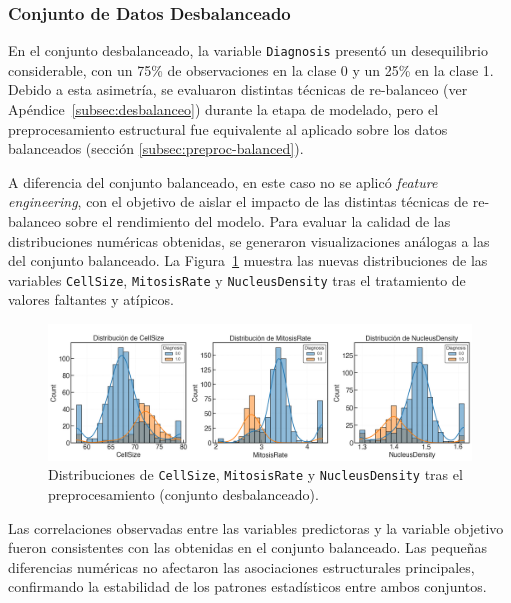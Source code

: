\begin{multicols}{2}
\subsubsection{Conjunto de Datos Desbalanceado}
\label{subsec:preproc-imbalanced}

En el conjunto desbalanceado, la variable \texttt{Diagnosis} presentó un desequilibrio considerable, con un 75\% de observaciones en la clase 0 y un 25\% en la clase 1. Debido a esta asimetría, se evaluaron distintas técnicas de re-balanceo (ver Apéndice~\ref{subsec:desbalanceo}) durante la etapa de modelado, pero el preprocesamiento estructural fue equivalente al aplicado sobre los datos balanceados (sección \ref{subsec:preproc-balanced}).

A diferencia del conjunto balanceado, en este caso no se aplicó \textit{feature engineering}, con el objetivo de aislar el impacto de las distintas técnicas de re-balanceo sobre el rendimiento del modelo. Para evaluar la calidad de las distribuciones numéricas obtenidas, se generaron visualizaciones análogas a las del conjunto balanceado. La Figura~\ref{fig:enter-label} muestra las nuevas distribuciones de las variables \texttt{CellSize}, \texttt{MitosisRate} y \texttt{NucleusDensity} tras el tratamiento de valores faltantes y atípicos.


\begin{figure}[H]
    \centering
    \includegraphics[width=1\linewidth]{figures/p1/distribucion_desbalanceados.png}
    \caption{Distribuciones de \texttt{CellSize}, \texttt{MitosisRate} y \texttt{NucleusDensity} tras el preprocesamiento (conjunto desbalanceado).}
    \label{fig:enter-label}
\end{figure}

Las correlaciones observadas entre las variables predictoras y la variable objetivo fueron consistentes con las obtenidas en el conjunto balanceado. Las pequeñas diferencias numéricas no afectaron las asociaciones estructurales principales, confirmando la estabilidad de los patrones estadísticos entre ambos conjuntos.


\end{multicols}
